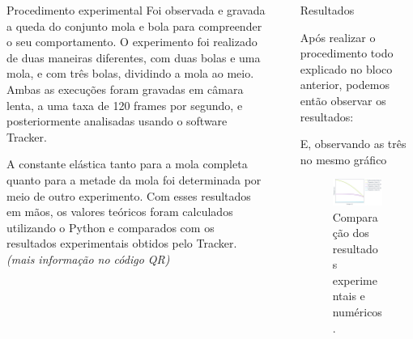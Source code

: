 \documentclass[final]{beamer}
\newlength{\sepwidth}
\newlength{\colwidth}
\newcommand{\separatorcolumn}{\begin{column}{\sepwidth}\end{column}}
\begin{document}
\begin{frame}[t]
\begin{columns}[t]
\begin{column}{\colwidth}
\begin{block}{Procedimento experimental}
   Foi observada e gravada a queda do conjunto mola e bola para compreender o seu comportamento. O experimento foi realizado de duas maneiras diferentes, com duas bolas e uma mola, e com três bolas, dividindo a mola ao meio. Ambas as execuções foram gravadas em câmara lenta, a uma taxa de 120 frames por segundo, e posteriormente analisadas usando o software Tracker.
    
 A constante elástica tanto para a mola completa quanto para a metade da mola foi determinada por meio de outro experimento. Com esses resultados em mãos, os valores teóricos foram calculados utilizando o Python e comparados com os resultados experimentais obtidos pelo Tracker. \emph{(mais informação no código QR)}
\end{block}



\end{column}

\separatorcolumn

\begin{column}{\colwidth}


\begin{block}{Resultados}
    
    Após realizar o procedimento todo explicado no bloco anterior, podemos então observar os resultados:
    
    E, observando as três no mesmo gráfico
   \begin{figure}
   \includegraphics[width=.5\columnwidth]{images/4v2.jpg}
   \caption{Comparação dos resultados experimentais e numéricos.}
   \end{figure}
\end{block}


\end{column}
\end{columns}
\end{frame}
\end{document}
